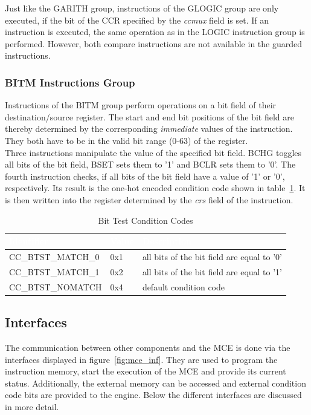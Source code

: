 Just like the GARITH group, instructions of the GLOGIC group are only executed, if the bit of the CCR specified by the \emph{ccmux} field is set.
If an instruction is executed, the same operation as in the LOGIC instruction group is performed.
However, both compare instructions are not available in the guarded instructions.

\subsubsection{BITM Instructions Group}

Instructions of the BITM group perform operations on a bit field of their destination/source register.
The start and end bit positions of the bit field are thereby determined by the corresponding \emph{immediate} values of the instruction.
They both have to be in the valid bit range (0-63) of the register.\\
Three instructions manipulate the value of the specified bit field.
BCHG toggles all bits of the bit field, BSET sets them to '1' and BCLR sets them to '0'.
The fourth instruction checks, if all bits of the bit field have a value of '1' or '0', respectively.
Its result is the one-hot encoded condition code shown in table~\ref{btst_cond}.
It is then written into the register determined by the \emph{crs} field of the instruction. 

\begin{table}[htb]
\centering
\begin{tabular}{|l| l| l|}
    \hline
    \rowcolor{black!70}
    \textcolor{white}{\textbf{Identifier}} & \textcolor{white}{\textbf{Value}} & \textcolor{white}{\textbf{Description}} \\
    \hline
    CC\_BTST\_MATCH\_0 & 0x1 & all bits of the bit field are equal to '0'\\
    \hline
    \rowcolor{black!10}
    CC\_BTST\_MATCH\_1 & 0x2 & all bits of the bit field are equal to '1' \\
    \hline
    CC\_BTST\_NOMATCH  & 0x4 & default condition code \\
    \hline
\end{tabular}
\caption{Bit Test Condition Codes} \label{btst_cond}
\end{table}

\subsection{Interfaces}

The communication between other components and the MCE is done via the interfaces displayed in figure~\ref{fig:mce_inf}.
They are used to program the instruction memory, start the execution of the MCE and provide its current status.
Additionally, the external memory can be accessed and external condition code bits are provided to the engine.
Below the different interfaces are discussed in more detail.

